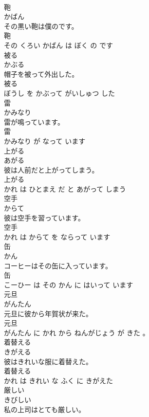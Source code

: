 \documentclass[8pt]{extreport}
\begin{document}
\begin{CJK}{UTF8}{min}
\\	鞄	
\\	かばん			
\\	その黒い鞄は僕のです。	
\\	鞄 
\\	その くろい かばん は ぼく の です			
\\	被る	
\\	かぶる			
\\	帽子を被って外出した。	
\\	被る 
\\	ぼうし を かぶって がいしゅつ した			
\\	雷	
\\	かみなり			
\\	雷が鳴っています。	
\\	雷 
\\	かみなり が なって います			
\\	上がる	
\\	あがる			
\\	彼は人前だと上がってしまう。	
\\	上がる 
\\	かれ は ひとまえ だ と あがって しまう			
\\	空手	
\\	からて			
\\	彼は空手を習っています。	
\\	空手 
\\	かれ は からて を ならって います			
\\	缶	
\\	かん			
\\	コーヒーはその缶に入っています。	
\\	缶 
\\	こーひー は その かん に はいって います			
\\	元旦	
\\	がんたん			
\\	元旦に彼から年賀状が来た。	
\\	元旦 
\\	がんたん に かれ から ねんがじょう が きた 。			
\\	着替える	
\\	きがえる			
\\	彼はきれいな服に着替えた。	
\\	着替える 
\\	かれ は きれい な ふく に きがえた			
\\	厳しい	
\\	きびしい			
\\	私の上司はとても厳しい。	

\end{CJK}
\end{document}
